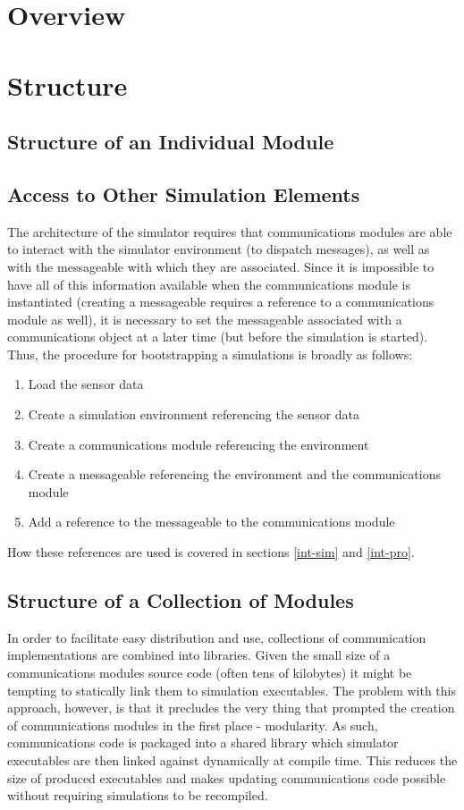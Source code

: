 \section{Overview}

\section{Structure}
	\subsection{Structure of an Individual Module}
		\subsection{Access to Other Simulation Elements}
		
The architecture of the simulator requires that communications modules are able to interact with the simulator environment (to dispatch messages), as well as with the messageable with which they are associated. Since it is impossible to have all of this information available when the communications module is instantiated (creating a messageable requires a reference to a communications module as well), it is necessary to set the messageable associated with a communications object at a later time (but before the simulation is started). Thus, the procedure for bootstrapping a simulations is broadly as follows:

\begin{enumerate}
	\item Load the sensor data
	\item Create a simulation environment referencing the sensor data
	\item Create a communications module referencing the environment
	\item Create a messageable referencing the environment and the communications module
	\item Add a reference to the messageable to the communications module
\end{enumerate}

How these references are used is covered in sections \ref{int-sim} and \ref{int-pro}.
		
	\subsection{Structure of a Collection of Modules}
	
In order to facilitate easy distribution and use, collections of communication implementations are combined into libraries. Given the small size of a communications modules source code (often tens of kilobytes) it might be tempting to statically link them to simulation executables. The problem with this approach, however, is that it precludes the very thing that prompted the creation of communications modules in the first place - modularity. As such, communications code is packaged into a shared library which simulator executables are then linked against dynamically at compile time. This reduces the size of produced executables and makes updating communications code possible without requiring simulations to be recompiled.

